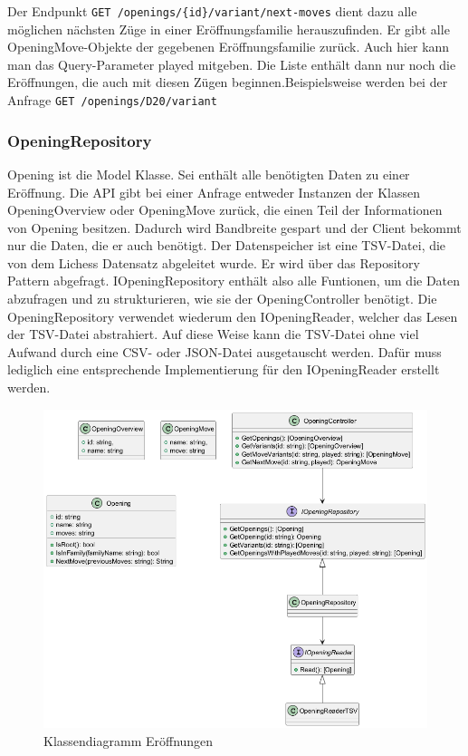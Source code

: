Der Endpunkt \lstinline|GET /openings/{id}/variant/next-moves| dient dazu alle möglichen nächsten Züge in einer Eröffnungsfamilie herauszufinden. Er gibt alle OpeningMove-Objekte der gegebenen Eröffnungsfamilie zurück. Auch hier kann man das Query-Parameter played mitgeben. Die Liste enthält dann nur noch die Eröffnungen, die auch mit diesen Zügen beginnen.Beispielsweise werden bei der Anfrage \lstinline|GET /openings/D20/variant|


\subsubsection{OpeningRepository}
Opening ist die Model Klasse. Sei enthält alle benötigten Daten zu einer Eröffnung. Die API gibt bei einer Anfrage entweder Instanzen der Klassen OpeningOverview oder OpeningMove zurück, die einen Teil der Informationen von Opening besitzen. Dadurch wird Bandbreite gespart und der Client bekommt nur die Daten, die er auch benötigt. Der Datenspeicher ist eine TSV-Datei, die von dem Lichess Datensatz abgeleitet wurde. %
Er wird über das Repository Pattern abgefragt. IOpeningRepository enthält also alle Funtionen, um die Daten abzufragen und zu strukturieren, wie sie der OpeningController benötigt. Die OpeningRepository verwendet wiederum den IOpeningReader, welcher das Lesen der TSV-Datei abstrahiert. Auf diese Weise kann die TSV-Datei ohne viel Aufwand durch eine CSV- oder JSON-Datei ausgetauscht werden. Dafür muss lediglich eine entsprechende Implementierung für den IOpeningReader erstellt werden.

\begin{figure}[h]
  \includegraphics[width=\linewidth]{images/diagrams/opening.png}
  \caption{Klassendiagramm Eröffnungen}
  \label{fig:cd_opening}
\end{figure}

